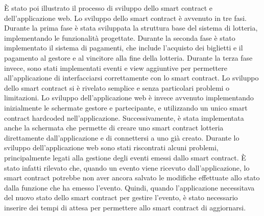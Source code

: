\documentclass[12pt,a4paper,openright,twoside]{report}
\begin{document}
È stato poi illustrato il processo di sviluppo dello smart contract e dell'applicazione web. Lo sviluppo dello smart contract è avvenuto in tre fasi. Durante la prima fase è stata sviluppata la struttura base del sistema di lotteria, implementando le funzionalità progettate. Durante la seconda fase è stato implementato il sistema di pagamenti, che include l'acquisto dei biglietti e il pagamento al gestore e al vincitore alla fine della lotteria. Durante la terza fase invece, sono stati implementati eventi e view aggiuntive per permettere all'applicazione di interfacciarsi correttamente con lo smart contract. Lo sviluppo dello smart contract si è rivelato semplice e senza particolari problemi o limitazioni. Lo sviluppo dell'applicazione web è invece avvenuto implementando inizialmente le schermate gestore e partecipante, e utilizzando un unico smart contract hardcoded nell'applicazione. Successivamente, è stata implementata anche la schermata che permette di creare uno smart contract lotteria direttamente dall'applicazione e di connettersi a uno già creato. Durante lo sviluppo dell'applicazione web sono stati riscontrati alcuni problemi, principalmente legati alla gestione degli eventi emessi dallo smart contract. È stato infatti rilevato che, quando un evento viene ricevuto dall'applicazione, lo smart contract potrebbe non aver ancora salvato le modifiche effettuate allo stato dalla funzione che ha emesso l'evento. Quindi, quando l'applicazione necessitava del nuovo stato dello smart contract per gestire l'evento, è stato necessario inserire dei tempi di attesa per permettere allo smart contract di aggiornarsi.\\
\end{document}
